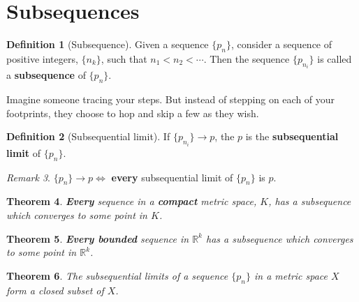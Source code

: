 \documentclass[a4paper,12pt]{report}
\newcommand{\R}{\mathbb{R}}
\newcommand{\tb}{\textbf}
\theoremstyle{plain}
\newtheorem{theorem}{\color{blue}Theorem}[chapter] %
\theoremstyle{definition}
\newtheorem{definition}[theorem]{\color{red}Definition} %
\theoremstyle{remark}
\newtheorem{remark}[theorem]{\color{ForestGreen}Remark} %
\begin{document}
\section{Subsequences}
\begin{definition}[Subsequence]
Given a sequence $\{p_n\}$, consider a sequence of positive integers, $\{n_k\}$, such that $n_1<n_2<\cdots$. Then the sequence $\{p_{n_i}\}$ is called a \tb{subsequence} of $\{p_n\}$.
\end{definition}
\begin{insight}
Imagine someone tracing your steps. But instead of stepping on each of your footprints, they choose to hop and skip a few as they wish.
\end{insight}
\begin{definition}[Subsequential limit]
If $\{p_{n_i}\}\to p$, the $p$ is the \tb{subsequential limit} of $\{p_n\}$.
\end{definition}
\begin{remark}
$\{p_n\}\to p\iff$ \tb{every} subsequential limit of $\{p_n\}$ is $p$.
\end{remark}
\begin{theorem}
\tb{Every} sequence in a \tb{compact} metric space, $K$, has a subsequence which converges to some point in $K$.
\end{theorem}
\begin{theorem}
\tb{Every bounded} sequence in $\R^k$ has a subsequence which converges to some point in $\R^k$.
\end{theorem}
\begin{theorem}
The subsequential limits of a sequence $\{p_n\}$ in a metric space $X$ form a closed subset of $X$.
\end{theorem}
\end{document}

